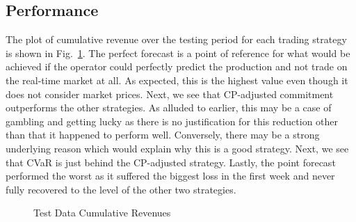 \documentclass[
  journal,
]{IEEEtran}%
\begin{document}
\subsection{Performance}\label{performance-2}

The plot of cumulative revenue over the testing period for each trading
strategy is shown in Fig.~\ref{fig-cumulative-revenue}. The perfect
forecast is a point of reference for what would be achieved if the
operator could perfectly predict the production and not trade on the
real-time market at all. As expected, this is the highest value even
though it does not consider market prices. Next, we see that CP-adjusted
commitment outperforms the other strategies. As alluded to earlier, this
may be a case of gambling and getting lucky as there is no justification
for this reduction other than that it happened to perform well.
Conversely, there may be a strong underlying reason which would explain
why this is a good strategy. Next, we see that CVaR is just behind the
CP-adjusted strategy. Lastly, the point forecast performed the worst as
it suffered the biggest loss in the first week and never fully recovered
to the level of the other two strategies.

\begin{figure}


\caption{\label{fig-cumulative-revenue}Test Data Cumulative Revenues}

\end{figure}%
\end{document}
